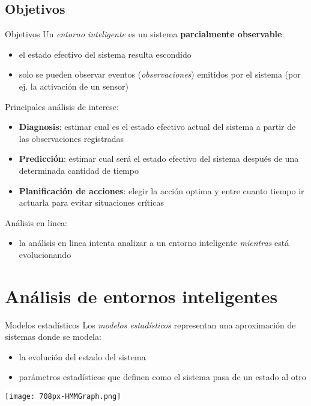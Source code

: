 \documentclass[9pt, handout]{beamer}
\begin{document}
    \subsection{Objetivos}
      \begin{frame}{Objetivos}
        \pause
        Un \textit{entorno inteligente} es un sistema \textbf{parcialmente observable}:
        \pause
        \begin{itemize}
          \item el estado efectivo del sistema resulta escondido
          \pause
          \item solo se pueden observar eventos (\textit{observaciones}) emitidos por el sistema (por ej. la activación de un sensor)\\[1em]
        \end{itemize}
        
        \pause
        
        Principales análisis de interese:
        \pause
        \begin{itemize}
          \item \textbf{Diagnosis}: estimar cual es el estado efectivo actual del sistema a partir de las observaciones registradas
          \pause
          \item \textbf{Predicción}: estimar cual será el estado efectivo del sistema después de una determinada cantidad de tiempo
          \item \textbf{Planificación de acciones}: elegir la acción optima y entre cuanto tiempo ir actuarla para evitar situaciones críticas\\[1em]
        \end{itemize}
        
        \pause
        
        Análisis en linea:
        \pause
        \begin{itemize}
          \item la análisis en linea intenta analizar a un entorno inteligente \textit{mientras} está evolucionando
        \end{itemize}
      \end{frame}
    
  \section{Análisis de entornos inteligentes}
  
    \begin{frame}{Modelos estadísticos}
      Los \textit{modelos estadísticos} representan una aproximación de sistemas donde se modela:
      \begin{itemize}
        \item la evolución del estado del sistema
        \item parámetros estadísticos que definen como el sistema pasa de un estado al otro
      \end{itemize}
      \begin{center}
        \colorbox{white}{\texttt{[image: 708px-HMMGraph.png]}}
      \end{center}
    \end{frame}
    
\end{document}
